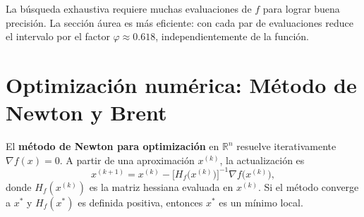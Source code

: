 \documentclass[a4,11pt]{aleph-notas}
\begin{document}
\begin{advertencia}
    La búsqueda exhaustiva requiere muchas evaluaciones de $f$ para lograr buena precisión. La sección áurea es más eficiente: con cada par de evaluaciones reduce el intervalo por el factor $\varphi\approx 0.618$, independientemente de la función.
\end{advertencia}


\section{Optimización numérica: Método de Newton y Brent}

\begin{defi}
    El \textbf{método de Newton para optimización} en $\mathbb{R}^n$ resuelve iterativamente $\nabla f({x})={0}$. A partir de una aproximación ${x}^{(k)}$, la actualización es
    \[
        {x}^{(k+1)}
        =
        {x}^{(k)}
        -
        \bigl[H_f\bigl({x}^{(k)}\bigr)\bigr]^{-1}
        \nabla f\bigl({x}^{(k)}\bigr),
    \]
    donde $H_f({x}^{(k)})$ es la matriz hessiana evaluada en ${x}^{(k)}$. Si el método converge a ${x}^*$ y $H_f({x}^*)$ es definida positiva, entonces ${x}^*$ es un mínimo local.
\end{defi}
\end{document}
